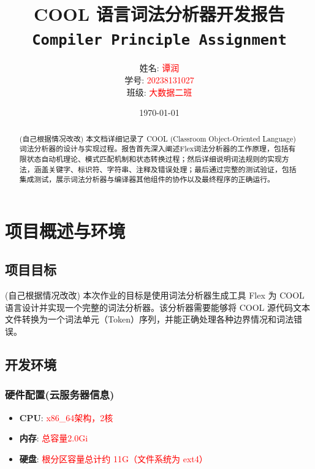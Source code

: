 \documentclass[twocolumn]{article}
\title{
    \vspace{-1cm} %
    \textbf{COOL 语言词法分析器开发报告} \\
    \large \texttt{Compiler Principle Assignment}
}
\author{
    姓名: \textcolor{red}{谭润} \\
    学号: \textcolor{red}{20238131027} \\
    班级: \textcolor{red}{大数据二班}
}
\date{\today}
\begin{document}
\maketitle
\thispagestyle{fancy} %

\begin{abstract}
\noindent
(自己根据情况改改)
本文档详细记录了 COOL (Classroom Object-Oriented Language) 词法分析器的设计与实现过程。报告首先深入阐述Flex词法分析器的工作原理，包括有限状态自动机理论、模式匹配机制和状态转换过程；然后详细说明词法规则的实现方法，涵盖关键字、标识符、字符串、注释及错误处理；最后通过完整的测试验证，包括集成测试，展示词法分析器与编译器其他组件的协作以及最终程序的正确运行。

\textcolor{red}{%
}
\end{abstract}

\section{项目概述与环境}
\subsection{项目目标}
(自己根据情况改改)
本次作业的目标是使用词法分析器生成工具 Flex 为 COOL 语言设计并实现一个完整的词法分析器。该分析器需要能够将 COOL 源代码文本文件转换为一个词法单元（Token）序列，并能正确处理各种边界情况和词法错误。

\subsection{开发环境}

\textcolor{red}{%
}

\subsubsection{硬件配置(云服务器信息)}
\begin{itemize}
    \item \textbf{CPU}: \textcolor{red}{x86_64架构，2核}
    \item \textbf{内存}: \textcolor{red}{总容量2.0Gi}
    \item \textbf{硬盘}: \textcolor{red}{根分区容量总计约 11G（文件系统为 ext4）}
\end{itemize}
\end{document}
